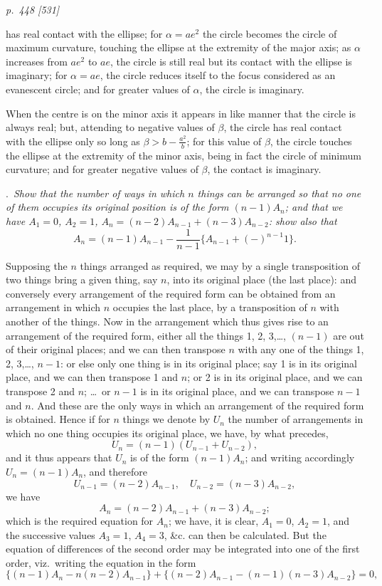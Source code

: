 \documentclass[11pt,a4paper]{article}
\theoremstyle{plain}
\theoremstyle{definition}
\begin{document}
\clearpage

\bigskip
\textit{p.~448 [531]}
\smallskip

has real contact with the ellipse; for $\alpha = ae^2$ the circle becomes the circle of maximum
curvature, touching the ellipse at the extremity of the major axis; as $\alpha$ increases from
$ae^2$ to $ae$, the circle is still real but its contact with the ellipse is imaginary; for
$\alpha = ae$, the circle reduces itself to the focus considered as an evanescent circle; and
for greater values of $\alpha$, the circle is imaginary.

When the centre is on the minor axis it appears in like manner that the circle
is always real; but, attending to negative values of $\beta$, the circle has real contact
with the ellipse only so long as $\beta > b-\frac{a^2}{b}$; for this value of $\beta$, the circle touches
the ellipse at the extremity of the minor axis, being in fact the circle of minimum
curvature; and for greater negative values of $\beta$, the contact is imaginary.

\medskip
{}.\ \textit{Show that the number of ways in which $n$ things can be arranged so that no
one of them occupies its original position is of the form $(n-1)A_n$; and that we have
$A_1=0$, $A_2=1$, $A_n=(n-2)A_{n-1}+(n-3)A_{n-2}$: show also that}
\[
A_n=(n-1)A_{n-1}-\frac{1}{n-1}\{A_{n-1}+(-)^{n-1}1\}.
\]

\medskip
Supposing the $n$ things arranged as required, we may by a single transposition of
two things bring a given thing, say $n$, into its original place (the last place): and
conversely every arrangement of the required form can be obtained from an arrangement
in which $n$ occupies the last place, by a transposition of $n$ with another of the
things. Now in the arrangement which thus gives rise to an arrangement of the
required form, either all the things 1, 2, 3,\ldots, $(n-1)$ are out of their original places;
and we can then transpose $n$ with any one of the things 1, 2, 3,\ldots, $n-1$: or else
only one thing is in its original place; say 1 is in its original place, and we can then
transpose 1 and $n$; or 2 is in its original place, and we can transpose 2 and $n$; \ldots\
or $n-1$ is in its original place, and we can transpose $n-1$ and $n$. And these are the
only ways in which an arrangement of the required form is obtained. Hence if for
$n$ things we denote by $U_n$ the number of arrangements in which no one thing
occupies its original place, we have, by what precedes,
\[
U_n=(n-1)(U_{n-1}+U_{n-2}),
\]
and it thus appears that $U_n$ is of the form $(n-1)A_n$; and writing accordingly
$U_n=(n-1)A_n$, and therefore
\[
U_{n-1}=(n-2)A_{n-1}, \quad U_{n-2}=(n-3)A_{n-2},
\]
we have
\[
A_n=(n-2)A_{n-1}+(n-3)A_{n-2};
\]
which is the required equation for $A_n$; we have, it is clear, $A_1=0$, $A_2=1$, and the
successive values $A_3=1$, $A_4=3$, \&c. can then be calculated. But the equation of
differences of the second order may be integrated into one of the first order, viz.\
writing the equation in the form
\[
\{(n-1)A_n-n(n-2)A_{n-1}\}+\{(n-2)A_{n-1}-(n-1)(n-3)A_{n-2}\}=0,
\]
\end{document}
